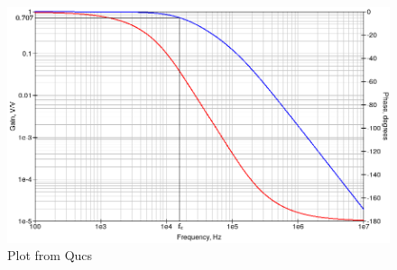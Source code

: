 \documentclass[12pt, a4paper]{article}
\begin{document}
\begin{figure}[h!]
\centering
\includegraphics[width = 420pt]{images/qucs-plot.png}
\caption{Plot from Qucs}
\label{fig:qucs_plot}
\end{figure}
\end{document}
